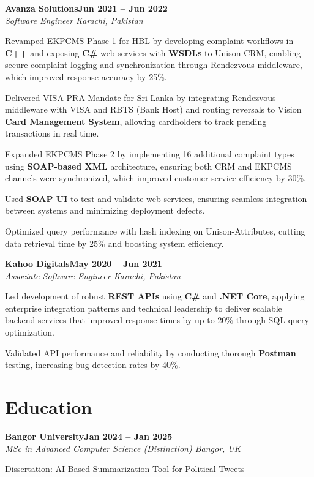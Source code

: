 \documentclass[letterpaper,10pt]{article}
\newcommand{\headingBf}[2]{
  \hspace{10pt}\textbf{#1}\hfill\textbf{#2}\\
}
\newcommand{\headingIt}[2]{
  \hspace{10pt}\textit{#1}\hfill\textit{#2}\\
}
\newenvironment{resume_list}{
  \vspace{-7pt}
  \begin{itemize}[itemsep=-2px, parsep=1pt, leftmargin=30pt]
}{
  \end{itemize}
}
\begin{document}
\headingBf{Avanza Solutions}{Jun 2021 -- Jun 2022}
\headingIt{Software Engineer \hfill Karachi, Pakistan}{}
\begin{resume_list}
    \item Revamped EKPCMS Phase 1 for HBL by developing complaint workflows in \textbf{C++} and exposing \textbf{C\#} web services with \textbf{WSDLs} to Unison CRM, enabling secure complaint logging and synchronization through Rendezvous middleware, which improved response accuracy by 25\%.
    \item Delivered VISA PRA Mandate for Sri Lanka by integrating Rendezvous middleware with VISA and RBTS (Bank Host) and routing reversals to Vision \textbf{Card Management System}, allowing cardholders to track pending transactions in real time.
    \item Expanded EKPCMS Phase 2 by implementing 16 additional complaint types using \textbf{SOAP-based XML} architecture, ensuring both CRM and EKPCMS channels were synchronized, which improved customer service efficiency by 30\%.
    \item Used \textbf{SOAP UI} to test and validate web services, ensuring seamless integration between systems and minimizing deployment defects.
    \item Optimized query performance with hash indexing on Unison-Attributes, cutting data retrieval time by 25\% and boosting system efficiency.
\end{resume_list}

\headingBf{Kahoo Digitals}{May 2020 -- Jun 2021}
\headingIt{Associate Software Engineer \hfill Karachi, Pakistan}{}
\begin{resume_list}
    \item Led development of robust \textbf{REST APIs} using \textbf{C\#} and \textbf{.NET Core}, applying enterprise integration patterns and technical leadership to deliver scalable backend services that improved response times by up to 20\% through SQL query optimization.
    \item Validated API performance and reliability by conducting thorough \textbf{Postman} testing, increasing bug detection rates by 40\%.
\end{resume_list}

\section{Education}

\headingBf{Bangor University}{Jan 2024 -- Jan 2025}
\headingIt{MSc in Advanced Computer Science (Distinction) \hfill Bangor, UK}{}
\begin{resume_list}
    \item Dissertation: AI-Based Summarization Tool for Political Tweets
\end{resume_list}
\end{document}
